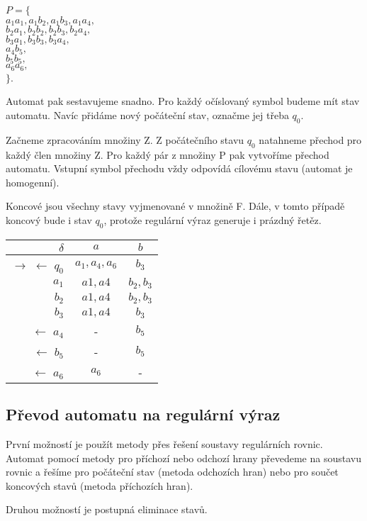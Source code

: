 \documentclass{article}
\begin{document}
\noindent
$P = \{$\\
$a_1a_1, a_1b_2, a_1b_3, a_1a_4,$\\
$b_2a_1, b_2b_2, b_2b_3, b_2a_4,$\\
$b_3a_1, b_3b_3, b_3a_4,$\\
$a_4b_5,$\\
$b_5b_5,$\\
$a_6a_6,$\\
$\}$.

Automat pak sestavujeme snadno. Pro každý očíslovaný symbol budeme mít stav automatu. Navíc přidáme nový počáteční stav, označme jej třeba $q_0$.

Začneme zpracováním množiny Z. Z počátečního stavu $q_0$ natahneme přechod pro každý člen množiny Z.
Pro každý pár z množiny P pak vytvoříme přechod automatu. Vstupní symbol přechodu vždy odpovídá cílovému stavu (automat je homogenní). 

Koncové jsou všechny stavy vyjmenované v množině F. Dále, v tomto případě koncový bude i stav $q_0$, protože regulární výraz generuje i prázdný řetěz.

\begin{tabular}{|r||c|c|}
\hline
 $\delta$ &      $a$ &   $b$\\
\hline
\hline
$\rightarrow$ $\leftarrow$ $q_0$ &       $a_1,a_4,a_6$ &    $b_3$\\
$a_1$ &  $a1,a4$ &       $b_2,b_3$\\
$b_2$ &  $a1,a4$ &       $b_2,b_3$\\
$b_3$ &  $a1,a4$ &       $b_3$\\
$\leftarrow$ $a_4$ &     - &     $b_5$\\
$\leftarrow$ $b_5$ &     - &     $b_5$\\
$\leftarrow$ $a_6$ &     $a_6$ &  -\\
\hline
\end{tabular}

\subsection{Převod automatu na regulární výraz}

První možností je použít metody přes řešení soustavy regulárních rovnic. Automat pomocí metody pro příchozí nebo odchozí hrany převedeme na soustavu rovnic a řešíme pro počáteční stav (metoda odchozích hran) nebo pro součet koncových stavů (metoda příchozích hran).

Druhou možností je postupná eliminace stavů.
\end{document}
